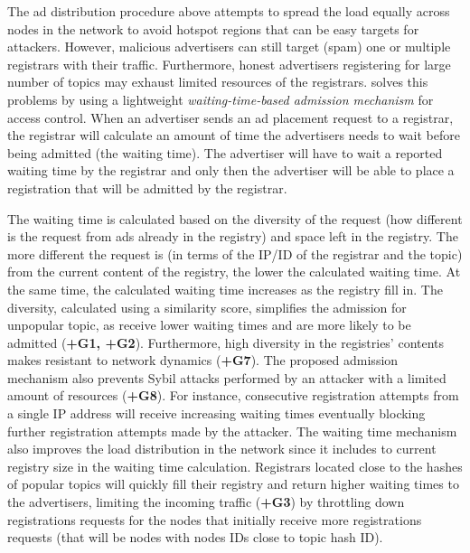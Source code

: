   The ad distribution procedure above attempts to spread the load equally across nodes in the network to avoid hotspot regions that can be easy targets for attackers. 
 However, malicious advertisers can still target (\ie spam) one or multiple registrars with their traffic. 
Furthermore,  honest advertisers registering for large number of topics may exhaust limited resources of the registrars. 
 \sysname solves this problems by using a lightweight \textit{waiting-time-based admission mechanism} for access control. When an advertiser sends an ad placement request to a registrar, the registrar will calculate an amount of time the advertisers needs to wait before being admitted (\ie the waiting time). 
The advertiser will have to wait a reported waiting time by the registrar and only then the advertiser will be able to place a registration that will be admitted by the registrar.
 
The waiting time is calculated based on the diversity of the request (\ie how different is the request from ads already in the registry) and space left in the registry. 
The more different the request is (in terms of the IP/ID of the registrar and the topic) from the current content of the registry, the lower the calculated waiting time. 
At the same time, the calculated waiting time increases as the registry fill in. 
The diversity,  calculated using a similarity score,  simplifies the admission for unpopular topic, as receive lower waiting times and are more likely to be admitted (\textbf{+G1, +G2}).
Furthermore,  high diversity in the registries' contents makes \sysname resistant to network dynamics (\textbf{+G7}). The proposed admission mechanism also prevents Sybil attacks performed by an attacker with a limited amount of resources (\textbf{+G8}). 
For instance, consecutive registration attempts from a single IP address will receive increasing waiting times eventually blocking further registration attempts made by the attacker. 
The waiting time mechanism also improves the load distribution in the network since it includes to current registry size in the waiting time calculation.
Registrars located close to the hashes of popular topics will quickly fill their registry and return higher waiting times to the advertisers, limiting the incoming traffic (\textbf{+G3}) by throttling down registrations requests for the nodes that initially receive more registrations requests (that will be nodes with nodes IDs close to topic hash ID).

